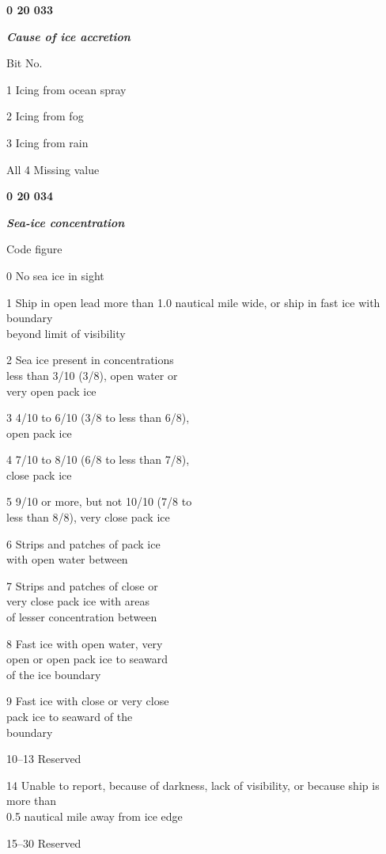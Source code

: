 \textbf{0 20 033}

\emph{\textbf{Cause of ice accretion}}

Bit No.

1 Icing from ocean spray

2 Icing from fog

3 Icing from rain

All 4 Missing value

\textbf{0 20 034}

\emph{\textbf{Sea-ice concentration}}

Code figure

0 No sea ice in sight

1 Ship in open lead more than 1.0 nautical mile wide, or ship in fast ice with boundary\\
beyond limit of visibility

2 Sea ice present in concentrations\\
less than 3/10 (3/8), open water or\\
very open pack ice

3 4/10 to 6/10 (3/8 to less than 6/8),\\
open pack ice

4 7/10 to 8/10 (6/8 to less than 7/8),\\
close pack ice

5 9/10 or more, but not 10/10 (7/8 to\\
less than 8/8), very close pack ice

6 Strips and patches of pack ice\\
with open water between

7 Strips and patches of close or\\
very close pack ice with areas\\
of lesser concentration between

8 Fast ice with open water, very\\
open or open pack ice to seaward\\
of the ice boundary

9 Fast ice with close or very close\\
pack ice to seaward of the\\
boundary

10--13 Reserved

14 Unable to report, because of darkness, lack of visibility, or because ship is more than\\
0.5 nautical mile away from ice edge

15--30 Reserved

